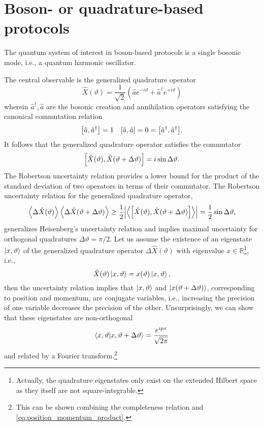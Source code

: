 \section{Boson- or quadrature-based protocols}

The quantum system of interest in boson-based protocols is a single bosonic mode, i.e., a quantum harmonic oscillator.

The central observable is the generalized quadrature operator~\cite[p.~36]{Barnett2002}
\begin{equation}
	\hat{X}(\vartheta)
	=
	\frac{1}{\sqrt{2}}
	\left(
		\hat{a}
		e^{-i\vartheta}
		+
		\hat{a}^\dagger
		e^{+i\vartheta}
	\right)
\end{equation}
wherein $\hat{a}^\dagger,\hat{a}$ are the bosonic creation and annihilation operators satisfying the canonical commutation relation
\begin{align}
	\comm{\hat{a}}{\hat{a}^\dagger}
	=
	1
	&&
	\comm{\hat{a}}{\hat{a}}
	=
	0
	=
	\comm{\hat{a}^\dagger}{\hat{a}^\dagger}
	.
\end{align}
It follows that the generalized quadrature operator satisfies the commutator
\begin{equation}
	\comm{\hat{X}(\vartheta)}{\hat{X}(\vartheta+\Delta\vartheta)}
	=
	i\sin\Delta\vartheta
	.
\end{equation}
The Robertson uncertainty relation provides a lower bound for the product of the standard deviation of two operators in terms of their commutator.
The Robertson uncertainty relation for the generalized quadrature operator,
\begin{equation}
	\expval{\Delta\hat{X}(\vartheta)}
	\expval{\Delta\hat{X}(\vartheta+\Delta\vartheta)}
	\geq
	\frac{1}{2}
	\abs{\expval{\comm{\hat{X}(\vartheta)}{\hat{X}(\vartheta+\Delta\vartheta)}}}
	=
	\frac{1}{2}
	\sin\Delta\vartheta
	,
\end{equation}
generalizes Heisenberg's uncertainty relation and implies maximal uncertainty for orthogonal quadratures $\Delta\vartheta=\pi/2$.
Let us assume the existence of an eigenstate $\ket{x,\vartheta}$ of the generalized quadrature operator $\Delta\hat{X}(\vartheta)$ with eigenvalue $x\in\mathbb{R}$\footnote{Actually, the quadrature eigenstates only exist on the extended Hilbert space as they itself are not square-integrable.}, i.e.,
\begin{equation}
	\hat{X}(\vartheta)
	\ket{x,\vartheta}
	=
	x(\vartheta)
	\ket{x,\vartheta}
	,
\end{equation}
then the uncertainty relation implies that $\ket{x,\vartheta}$ and $\ket{x(\vartheta+\Delta\vartheta)}$, corresponding to position and momentum, are conjugate variables, i.e., increasing the precision of one variable decreases the precision of the other.
Unsurprisingly, we can show that these eigenstates are non-orthogonal~\cite[p.~29]{Mukhanov2007}
\begin{equation}
	\braket{x,\vartheta}{x,\vartheta+\Delta\vartheta}
	=
	\frac{e^{ipx}}{\sqrt{2\pi}}
	\label{eq:position_momentum_product}
\end{equation}
and related by a Fourier transform.\footnote{This can be shown combining the completeness relation and \cref{eq:position_momentum_product}.}

